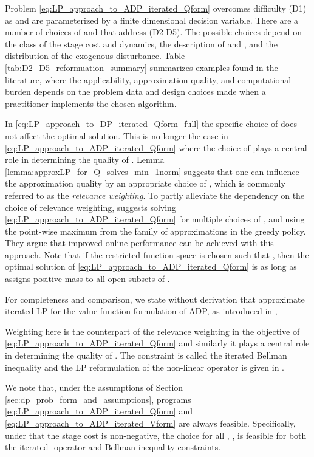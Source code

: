 \documentclass[journal]{IEEEtran}
\begin{document}
Problem \eqref{eq:LP_approach_to_ADP_iterated_Qform} overcomes difficulty (D1) as  and  are parameterized by a finite dimensional decision variable.
There are a number of choices of  and  that address (D2-D5). The possible choices depend on the class of the stage cost and dynamics, the description of  and , and the distribution of the exogenous disturbance.
Table \ref{tab:D2_D5_reformuation_summary} summarizes examples found in the literature, where the applicability, approximation quality, and computational burden depends on the problem data and design choices made when a practitioner implements the chosen algorithm.





In \eqref{eq:LP_approach_to_DP_iterated_Qform_full} the specific choice of  does not affect the optimal solution. This is no longer the case in \eqref{eq:LP_approach_to_ADP_iterated_Qform} where the choice of  plays a central role in determining the quality of .
Lemma \ref{lemma:approxLP_for_Q_solves_min_1norm} suggests that one can influence the approximation quality by an appropriate choice of , which is commonly referred to as the \emph{relevance weighting}.
To partly alleviate the dependency on the choice of relevance weighting, \cite{beuchat_2016_ECC_PWMQ} suggests solving \eqref{eq:LP_approach_to_ADP_iterated_Qform} for multiple choices of , and using the point-wise maximum from the family of approximations in the greedy policy. They argue that improved online performance can be achieved with this approach.
Note that if the restricted function space is chosen such that , then the optimal solution of \eqref{eq:LP_approach_to_ADP_iterated_Qform} is  as long as  assigns positive mass to all open subsets of .


For completeness and comparison, we state without derivation that approximate iterated LP for the value function formulation of ADP, as introduced in \cite{boyd_iteratedBellman},

Weighting  here is the counterpart of the relevance weighting in the objective of \eqref{eq:LP_approach_to_ADP_iterated_Qform} and similarly it plays a central role in determining the quality of .
The constraint is called the iterated Bellman inequality and the LP reformulation of the non-linear operator  is given in \cite[\S 3.4]{boyd_iteratedBellman}.



We note that, under the assumptions of Section \ref{sec:dp_prob_form_and_assumptions}, programs \eqref{eq:LP_approach_to_ADP_iterated_Qform} and \eqref{eq:LP_approach_to_ADP_iterated_Vform} are always feasible.
Specifically, under \cite[Assumption 4.2.1(a)]{hernandez_2012_discreteTimeMCP} that the stage cost is non-negative, the choice  for all , , is feasible for both the iterated -operator and Bellman inequality constraints.
\end{document}
